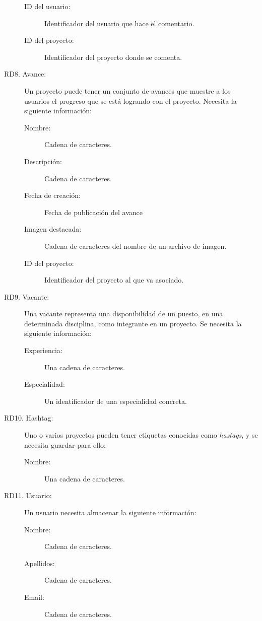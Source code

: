 \begin{description}
\begin{description}
            \item[ID del usuario:] Identificador del usuario que hace el comentario.
            \item[ID del proyecto:] Identificador del proyecto donde se comenta.
        \end{description}
    \item[RD8. Avance:] Un proyecto puede tener un conjunto de avances que muestre a los usuarios el progreso que se está logrando con el proyecto. Necesita la siguiente información:
        \begin{description}
            \item[Nombre:] Cadena de caracteres.
            \item[Descripción:] Cadena de caracteres.
            \item[Fecha de creación:] Fecha de publicación del avance
            \item[Imagen destacada:] Cadena de caracteres del nombre de un archivo de imagen.
            \item[ID del proyecto:] Identificador del proyecto al que va asociado.
        \end{description}
    \item[RD9. Vacante:] Una vacante representa una disponibilidad de un puesto, en una determinada disciplina, como integrante en un proyecto. Se necesita la siguiente información:
        \begin{description}
            \item[Experiencia:] Una cadena de caracteres.
            \item[Especialidad:] Un identificador de una especialidad concreta.
        \end{description}
    \item[RD10. Hashtag:] Uno o varios proyectos pueden tener etiquetas conocidas como \textit{hastags}, y se necesita guardar para ello:
        \begin{description}
            \item[Nombre:] Una cadena de caracteres.
        \end{description}
    \item[RD11. Usuario:] Un usuario necesita almacenar la siguiente información:
        \begin{description}
            \item[Nombre:] Cadena de caracteres.
            \item[Apellidos:] Cadena de caracteres.
            \item[Email:] Cadena de caracteres.

\end{description}
\end{description}
